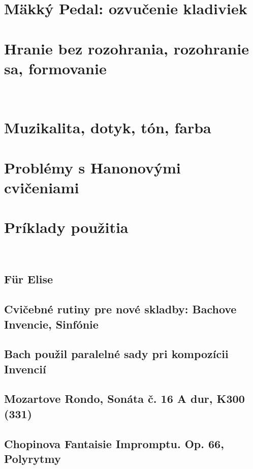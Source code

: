 \documentclass[11pt,a4paper]{book}
\begin{document}
\section{Mäkký Pedal: ozvučenie kladiviek}\label{s:soft-pedal}

\section{Hranie bez rozohrania, rozohranie sa, formovanie}\label{s:playing-cold}
\ 
\section{Muzikalita, dotyk, tón, farba}\label{s:musicality}

\section{Problémy s Hanonovými cvičeniami}\label{s:problems-hanon}

\section{Príklady použitia}\label{s:examples-applications}
\ 
\subsection{Für Elise}\label{s:fur-elise}

\subsection{Cvičebné rutiny pre nové skladby: Bachove Invencie, Sinfónie}\label{s:bach-inventions}

\subsection{Bach použil paralelné sady pri kompozícii Invencií}\label{s:bach-sets}

\subsection{Mozartove Rondo, Sonáta č. 16 A dur, K300 (331)}\label{s:mozart-rondo}

\subsection{Chopinova Fantaisie Impromptu. Op. 66, Polyrytmy}\label{s:chopin-impromptu}
\end{document}
